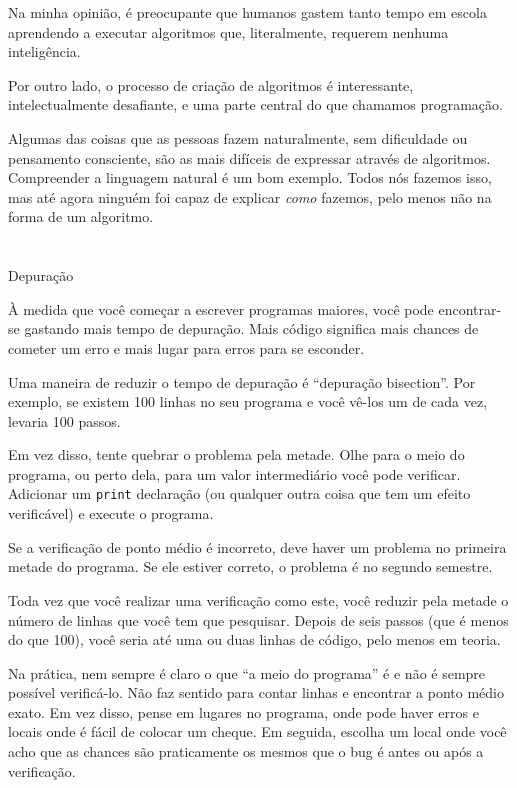 \documentclass[10pt]{book}
\begin{document}
\begin{exercise}
{Na minha opinião, é preocupante que humanos gastem tanto tempo em
escola aprendendo a executar algoritmos que, literalmente, requerem
nenhuma inteligência.

Por outro lado, o processo de criação de algoritmos é interessante,
intelectualmente desafiante, e uma parte central do que chamamos
programação.

Algumas das coisas que as pessoas fazem naturalmente, sem dificuldade ou
pensamento consciente, são as mais difíceis de expressar através de algoritmos.
Compreender a linguagem natural é um bom exemplo. Todos nós fazemos isso, mas
até agora ninguém foi capaz de explicar {\em como} fazemos, pelo menos
não na forma de um algoritmo.


\section{} Depuração

À medida que você começar a escrever programas maiores, você pode encontrar-se
gastando mais tempo de depuração. Mais código significa mais chances de
cometer um erro e mais lugar para erros para se esconder.

Uma maneira de reduzir o tempo de depuração é ``depuração bisection''.
Por exemplo, se existem 100 linhas no seu programa e você
vê-los um de cada vez, levaria 100 passos.

Em vez disso, tente quebrar o problema pela metade. Olhe para o meio
do programa, ou perto dela, para um valor intermediário você
pode verificar. Adicionar um {\tt print} declaração (ou qualquer outra coisa
que tem um efeito verificável) e execute o programa.

Se a verificação de ponto médio é incorreto, deve haver um problema no
primeira metade do programa. Se ele estiver correto, o problema é
no segundo semestre.

Toda vez que você realizar uma verificação como este, você reduzir pela metade o número de
linhas que você tem que pesquisar. Depois de seis passos (que é menos do que 100),
você seria até uma ou duas linhas de código, pelo menos em teoria.

Na prática, nem sempre é claro o que
``a meio do programa'' é e não é sempre possível
verificá-lo. Não faz sentido para contar linhas e encontrar a
ponto médio exato. Em vez disso, pense em lugares
no programa, onde pode haver erros e locais onde
é fácil de colocar um cheque. Em seguida, escolha um local onde você
acho que as chances são praticamente os mesmos que o bug é antes
ou após a verificação.




}
\end{exercise}
\end{document}
